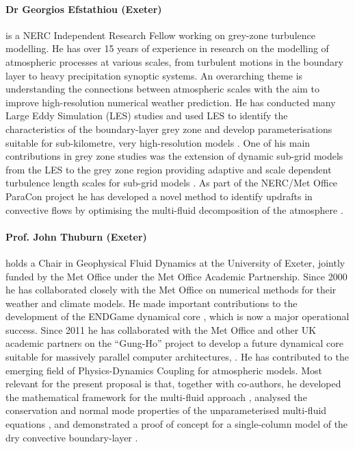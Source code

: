 \documentclass[11pt,a4paper]{article}
\begin{document}
\paragraph*{Dr Georgios Efstathiou (Exeter)} is a NERC Independent Research Fellow working on grey-zone turbulence modelling. He has over 15 years of experience in research on the modelling of
atmospheric processes at various scales, from turbulent motions in the boundary layer
to heavy precipitation synoptic systems. An overarching theme is understanding the
connections between atmospheric scales with the aim to improve high-resolution
numerical weather prediction. He has conducted many Large Eddy Simulation (LES) studies and used LES to identify 
the characteristics of the boundary-layer grey zone \citep[e.g.][]{efstathiou2015}
and develop parameterisations suitable for sub-kilometre, very high-resolution models 
\citep{efstathiou2016}. One of his main contributions in grey zone 
studies was the extension of dynamic sub-grid models from the LES to the grey zone region 
providing adaptive and scale dependent turbulence length scales for sub-grid models 
\citep{efstathiou2018,efstathiou2019a}. As part of the NERC/Met Office ParaCon 
project he has developed a novel method to identify updrafts in convective flows 
by optimising the multi-fluid decomposition of the atmosphere \citep{ETB20}.

\paragraph*{Prof. John Thuburn (Exeter)} holds a Chair in Geophysical Fluid Dynamics at the University of Exeter, jointly
funded by the Met Office under the Met Office Academic Partnership.
Since 2000 he has collaborated closely with the Met Office on numerical methods for their
weather and climate models. He made important contributions to the development of the
ENDGame dynamical core \cite[e.g.][]{WSW+14}, which is now a major operational success.
Since 2011 he has collaborated with the Met Office and other UK academic partners on the ``Gung-Ho''
project to develop a future dynamical core suitable for massively parallel computer
architectures, \citep[e.g.][]{MBSWTC19}.
He has contributed to the emerging field of Physics-Dynamics Coupling for atmospheric models.
Most relevant for the present proposal is that,
together with co-authors, he developed the mathematical framework for the multi-fluid
approach \citep[][]{TWV+18}, analysed the conservation and normal mode properties
of the unparameterised multi-fluid equations \citep[][]{TV18}, and demonstrated
a proof of concept for a single-column model of the dry convective boundary-layer \citep[][]{TEB19}.
\end{document}
